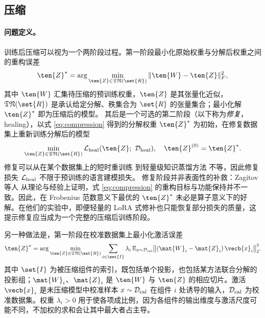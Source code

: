 \subsection{压缩}
\label{subsec:compression}

\paragraph{问题定义。}

训练后压缩可以视为一个两阶段过程。第一阶段最小化原始权重与分解后权重之间的重构误差
\begin{equation}
\label{eq:compression}
\ten{Z}^* =\arg\min_{\ten{Z}\in\mathfrak{TN}(\set{R})}\|\ten{W}-\ten{Z}\|_F^2,
\end{equation}
其中 $\ten{W}$ 汇集待压缩的预训练权重，$\ten{Z}$ 是其张量化近似，$\mathfrak{TN}(\set{R})$ 是承认给定分解、秩集合为 $\set{R}$ 的张量集合；最小化解 $\ten{Z}^*$ 即为压缩后的模型。
其后是一个可选的第二阶段（以下称为\emph{修复}，healing），以式 \eqref{eq:compression} 得到的分解权重 $\ten{Z}^*$ 为初始，在修复数据集上重新训练分解后的模型
\begin{equation}
\label{eq:healing}
\min_{\ten{Z} \in \mathfrak{TN}(\set{R})} \mathcal{L}_{\rm heal}(\ten{Z}; \ \mathcal{D}_{\rm heal}), \quad \ten{Z}^{(0)} = \ten{Z}^*.
\end{equation}
修复可以从在某个数据集上的短时重训练 \cite{compactifai} 到轻量级知识蒸馏方法 \cite{tahaei2021kroneckerbert} 不等，因此修复损失 $\mathcal{L}_{\rm heal}$ 不限于预训练的语言建模损失。
修复阶段并非表面性的补救：Zagitov 等人 \cite{zagitov2026rethinking} 从理论与经验上证明，式 \eqref{eq:compression} 的重构目标与功能保持并不一致。因此，在 Frobenius 范数意义下最优的 $\ten{Z}^*$ 未必是算子意义下的好解。在他们的实验中，即便轻量的 LoRA 式修补也只能恢复部分损失的质量，这提示修复应当成为一个完整的压缩后训练阶段。
    

另一种做法是，第一阶段在校准数据集上最小化激活误差 \cite{koikeakino2025latentllm}
\begin{equation}
\label{eq:compression-activation}
\ten{Z}^* = \arg\min_{\ten{Z} \in \mathfrak{TN}(\set{R})}
  \sum_{i \in \set{I}} \lambda_i \,
  \mathbb{E}_{x \sim \mathcal{D}_{\rm cal}}
  \bigl\| (\mat{W}_i - \mat{Z}_i)\, \vecb{x}_i \bigr\|_2^2 .
\end{equation}
其中 $\set{I}$ 为被压缩组件的索引，既包括单个投影，也包括某方法联合分解的投影组；$\mat{W}_i$、$\mat{Z}_i$ 是 $\ten{W}$ 与 $\ten{Z}$ 的相应切片。激活 $\vecb{x}_i$ 是未压缩模型中校准样本 $x \sim \mathcal{D}_{\rm cal}$ 在组件 $i$ 处诱导的输入，$\mathcal{D}_{\rm cal}$ 为校准数据集。权重 $\lambda_i > 0$ 用于使各项成比例，因为各组件的输出维度与激活尺度可能不同，不加权的求和会让其中最大者占主导。



